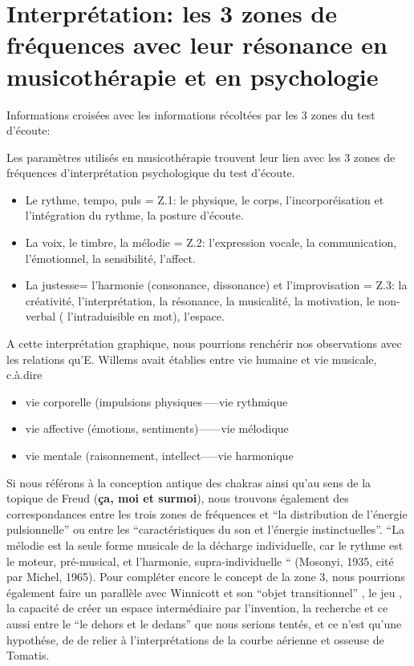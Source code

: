 \begin{enumerate}
\begin{figure}
	\label{groupecontroleimage1}
\end{figure}


\section{Interprétation: les 3 zones de fréquences avec leur résonance en musicothérapie et en
  psychologie}


	Informations croisées avec les informations récoltées par les 3 
          zones du test d'écoute:
          
Les paramètres utilisés en musicothérapie trouvent leur lien avec les
3 zones de fréquences d'interprétation psychologique du test d'écoute.
\begin{itemize}
 \item Le rythme, tempo, puls  =  Z.1: le physique, le corps, l'incorporéisation et
l'intégration du rythme,
la posture d'écoute.

\item La voix, le timbre, la mélodie =  Z.2:  l'expression vocale, la communication,
l'émotionnel, la sensibilité, l'affect.

\item La justesse= l'harmonie (consonance, dissonance) et l'improvisation = Z.3:  la créativité, l'interprétation, la
résonance, la musicalité, la motivation, le non-verbal (
l'intraduisible en mot), l'espace.
\end{itemize}
A cette interprétation graphique, nous pourrions renchérir nos
observations avec les relations
qu'E.
Willems  avait établies entre vie humaine et vie musicale, c.à.dire
\begin{itemize}
  \item vie corporelle (impulsions physiques-----vie rythmique
  \item vie affective (émotions, sentiments)------vie mélodique
    \item vie mentale (raisonnement, intellect-----vie harmonique
\end{itemize}

Si nous référons à la conception antique des chakras ainsi qu'au sens de la
topique de Freud (\textbf{ça, moi et surmoi}), nous trouvons également des correspondances
entre les trois zones de 
fréquences et ``la distribution de l'énergie pulsionnelle'' ou entre
les 
``caractéristiques du son et l'énergie instinctuelles''. \autocite[ch. 13]{auriol:cle} 
``La mélodie est la seule forme musicale de la décharge individuelle, car le rythme est le moteur, pré-musical, et l'harmonie, supra-individuelle `` (Mosonyi, 1935, cité par Michel, 1965).
Pour compléter encore le concept de la zone 3, nous pourrions
également faire un parallèle avec Winnicott et son ``objet
transitionnel'' , le jeu , la capacité de créer un espace
intermédiaire par l'invention, la recherche et ce aussi entre le ``le
dehors et le dedans'' que nous serions tentés, et ce n'est qu'une
hypothése, de de relier à l'interprétations de la courbe aérienne et osseuse de Tomatis. 
 

\end{enumerate}
